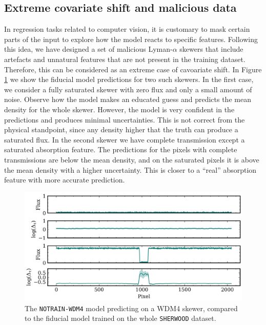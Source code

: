 \subsection{Extreme covariate shift and malicious data}
In regression tasks related to computer vision, it is customary to mask certain parts of the input to explore how the model reacts to specific features. Following this idea, we have designed a set of malicious Lyman-$\alpha$ skewers that include artefacts and unnatural features that are not present in the training dataset. Therefore, this can be considered as an extreme case of cavoariate shift. In Figure \ref{fig: skewer malicious} we show the fiducial model predictions for two such skewers. In the first case, we consider a fully saturated skewer with zero flux and only a small amount of noise. Observe how the model makes an educated guess and predicts the mean density for the whole skewer. However, the model is very confident in the predictions and produces minimal uncertainties. This is not correct from the physical standpoint, since any density higher that the truth can produce a saturated flux. In the second skewer we have complete transmission except a saturated absorption feature. The predictions for the pixels with complete transmissions are below the mean density, and on the saturated pixels it is above the mean density with a higher uncertainty. This is closer to a ``real'' absorption feature with more accurate prediction.

\begin{figure}
    \centering
    \includegraphics[width=0.9\linewidth]{img/ML/malicious_input.png}
    \caption{The \texttt{NOTRAIN-WDM4} model predicting on a WDM4 skewer, compared to the fiducial model trained on the whole \texttt{SHERWOOD} dataset.}
    \label{fig: skewer malicious}
\end{figure}


